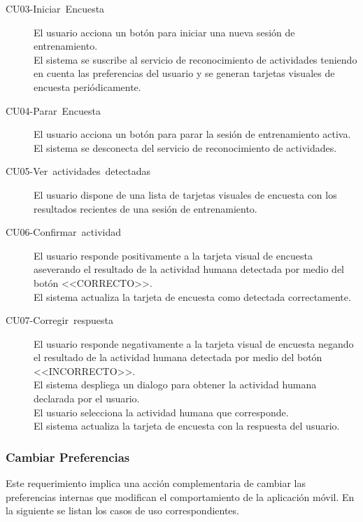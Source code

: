 \begin{description}
\item [{CU03-Iniciar~Encuesta}] El usuario acciona un botón para iniciar
una nueva sesión de entrenamiento. \\
El sistema se suscribe al servicio de reconocimiento de actividades
teniendo en cuenta las preferencias del usuario y se generan tarjetas
visuales de encuesta periódicamente.
\item [{CU04-Parar~Encuesta}] El usuario acciona un botón para parar la
sesión de entrenamiento activa. \\
El sistema se desconecta del servicio de reconocimiento de actividades.
\item [{CU05-Ver~actividades~detectadas}] El usuario dispone de una lista
de tarjetas visuales de encuesta con los resultados recientes de una
sesión de entrenamiento. 
\item [{CU06-Confirmar~actividad}] El usuario responde positivamente a
la tarjeta visual de encuesta aseverando el resultado de la actividad
humana detectada por medio del botón <<CORRECTO>>. \\
El sistema actualiza la tarjeta de encuesta como detectada correctamente.
\item [{CU07-Corregir~respuesta}] El usuario responde negativamente a
la tarjeta visual de encuesta negando el resultado de la actividad
humana detectada por medio del botón <<INCORRECTO>>. \\
El sistema despliega un dialogo para obtener la actividad humana declarada
por el usuario.\\
El usuario selecciona la actividad humana que corresponde. \\
El sistema actualiza la tarjeta de encuesta con la respuesta del usuario.
\end{description}

\subsubsection{Cambiar Preferencias}

Este requerimiento implica una acción complementaria de cambiar las
preferencias internas que modifican el comportamiento de la aplicación
móvil. En la siguiente  se listan los
casos de uso correspondientes.

